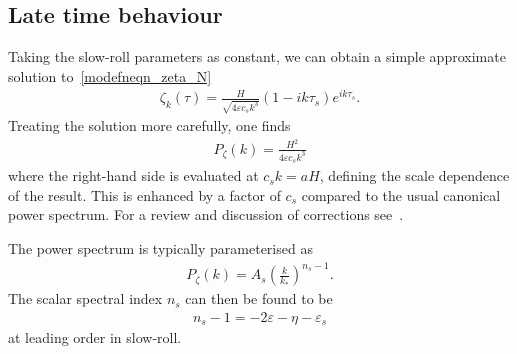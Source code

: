     \subsection{Late time behaviour}




    Taking the slow-roll parameters as constant, we can obtain a simple approximate solution
    to~\eqref{modefneqn_zeta_N}
    \begin{align}\label{uk_solution}
        \zeta_k(\tau) = \frac{H}{\sqrt{4\varepsilon c_s k^3}}\left(1-ik\tau_s\right)e^{i k\tau_s}.
    \end{align}
    Treating the solution more carefully, one finds
    \begin{align}
        P_\zeta(k) = \frac{H^2}{4\varepsilon c_s k^3}
    \end{align}
    where the right-hand side is evaluated at $c_sk=aH$,
    defining the scale dependence of the result.
    This is enhanced by a factor of $c_s$ compared to the
    usual canonical power spectrum.
    For a review and discussion of corrections see~\cite{px_burrage}.


The power spectrum is typically parameterised as
\begin{align}
    P_\zeta(k) = A_s \left(\frac{k}{k_*}\right)^{n_s-1}.
\end{align}
The scalar spectral index $n_s$ can then be found to be
\begin{align}
n_s-1 = -2\varepsilon-\eta-\varepsilon_s
\end{align}
at leading order in slow-roll.


